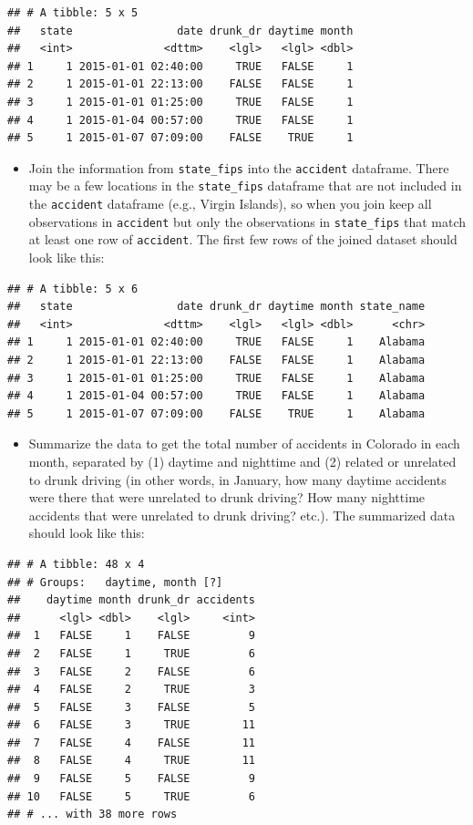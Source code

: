 \documentclass[]{book}
\providecommand{\tightlist}{%
  \setlength{\itemsep}{0pt}\setlength{\parskip}{0pt}}
\theoremstyle{definition}
\theoremstyle{definition}
\theoremstyle{definition}
\theoremstyle{remark}
\begin{document}
\begin{verbatim}
## # A tibble: 5 x 5
##   state                date drunk_dr daytime month
##   <int>              <dttm>    <lgl>   <lgl> <dbl>
## 1     1 2015-01-01 02:40:00     TRUE   FALSE     1
## 2     1 2015-01-01 22:13:00    FALSE   FALSE     1
## 3     1 2015-01-01 01:25:00     TRUE   FALSE     1
## 4     1 2015-01-04 00:57:00     TRUE   FALSE     1
## 5     1 2015-01-07 07:09:00    FALSE    TRUE     1
\end{verbatim}

\begin{itemize}
\tightlist
\item
  Join the information from \texttt{state\_fips} into the
  \texttt{accident} dataframe. There may be a few locations in the
  \texttt{state\_fips} dataframe that are not included in the
  \texttt{accident} dataframe (e.g., Virgin Islands), so when you join
  keep all observations in \texttt{accident} but only the observations
  in \texttt{state\_fips} that match at least one row of
  \texttt{accident}. The first few rows of the joined dataset should
  look like this:
\end{itemize}

\begin{verbatim}
## # A tibble: 5 x 6
##   state                date drunk_dr daytime month state_name
##   <int>              <dttm>    <lgl>   <lgl> <dbl>      <chr>
## 1     1 2015-01-01 02:40:00     TRUE   FALSE     1    Alabama
## 2     1 2015-01-01 22:13:00    FALSE   FALSE     1    Alabama
## 3     1 2015-01-01 01:25:00     TRUE   FALSE     1    Alabama
## 4     1 2015-01-04 00:57:00     TRUE   FALSE     1    Alabama
## 5     1 2015-01-07 07:09:00    FALSE    TRUE     1    Alabama
\end{verbatim}

\begin{itemize}
\tightlist
\item
  Summarize the data to get the total number of accidents in Colorado in
  each month, separated by (1) daytime and nighttime and (2) related or
  unrelated to drunk driving (in other words, in January, how many
  daytime accidents were there that were unrelated to drunk driving? How
  many nighttime accidents that were unrelated to drunk driving? etc.).
  The summarized data should look like this:
\end{itemize}

\begin{verbatim}
## # A tibble: 48 x 4
## # Groups:   daytime, month [?]
##    daytime month drunk_dr accidents
##      <lgl> <dbl>    <lgl>     <int>
##  1   FALSE     1    FALSE         9
##  2   FALSE     1     TRUE         6
##  3   FALSE     2    FALSE         6
##  4   FALSE     2     TRUE         3
##  5   FALSE     3    FALSE         5
##  6   FALSE     3     TRUE        11
##  7   FALSE     4    FALSE        11
##  8   FALSE     4     TRUE        11
##  9   FALSE     5    FALSE         9
## 10   FALSE     5     TRUE         6
## # ... with 38 more rows
\end{verbatim}
\end{document}
